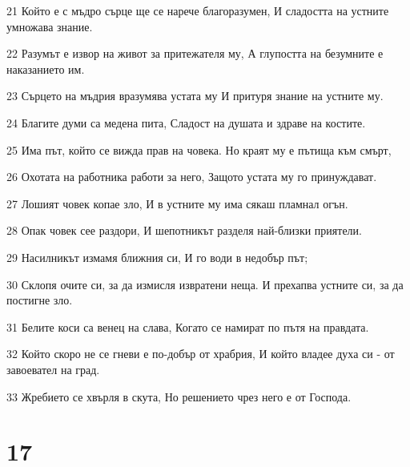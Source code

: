 \par 21 Който е с мъдро сърце ще се нарече благоразумен, И сладостта на устните умножава знание.
\par 22 Разумът е извор на живот за притежателя му, А глупостта на безумните е наказанието им.
\par 23 Сърцето на мъдрия вразумява устата му И притуря знание на устните му.
\par 24 Благите думи са медена пита, Сладост на душата и здраве на костите.
\par 25 Има път, който се вижда прав на човека. Но краят му е пътища към смърт,
\par 26 Охотата на работника работи за него, Защото устата му го принуждават.
\par 27 Лошият човек копае зло, И в устните му има сякаш пламнал огън.
\par 28 Опак човек сее раздори, И шепотникът разделя най-близки приятели.
\par 29 Насилникът измамя ближния си, И го води в недобър път;
\par 30 Склопя очите си, за да измисля извратени неща. И прехапва устните си, за да постигне зло.
\par 31 Белите коси са венец на слава, Когато се намират по пътя на правдата.
\par 32 Който скоро не се гневи е по-добър от храбрия, И който владее духа си - от завоевател на град.
\par 33 Жребието се хвърля в скута, Но решението чрез него е от Господа.

\chapter{17}

